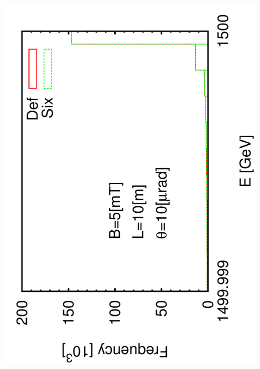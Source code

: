 \documentclass{beamer}
\begin{document}
\begin{frame}
 \includegraphics[scale=0.24,angle=-90]{histogram1e-5.pdf}\par

\end{frame}
\end{document}
